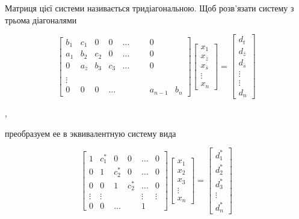 \documentclass[
  ukrainian,
]{article}
\begin{document}
Матриця цієї системи називається тридіагональною. Щоб розв'язати систему
з трьома діагоналями

\[
\begin{bmatrix} b_1 & c_1 & 0 & 0 & \dots & & & 0 \\ a_1 & b_2 & c_2 & 0 & \dots & & & 0 \\ 0 & a_{\bar{z}} & b_3 & c_3 & \dots & & & 0 \\ & & & & & & & & \\ \vdots & & & & & & & & \\ 0 & 0 & 0 & \dots & & & & a_{n-1} & b_n \end{bmatrix}
\begin{bmatrix} x_1 \\ x_{\bar{z}} \\ x_{\bar{s}} \\ \vdots \\ x_n \end{bmatrix}
=
\begin{bmatrix} d_t \\ d_{\bar{z}} \\ d_{\bar{s}} \\ \vdots \\ \vdots \\ d_n \end{bmatrix}
\]

,

преобразуем ее в эквивалентную систему вида

\[
\begin{bmatrix} 1 & c_1^* & 0 & 0 & \dots & 0 \\ 0 & 1 & c_2^* & 0 & \dots & 0 \\ 0 & 0 & 1 & c_2^* & \dots & 0 \\ \vdots & \vdots & & & \vdots & \vdots \\ 0 & 0 & \dots & & 1 \end{bmatrix}
\begin{bmatrix} x_1 \\ x_2 \\ x_3 \\ \vdots \\ x_n \end{bmatrix}
=
\begin{bmatrix} d_1^* \\ d_2^* \\ d_3^* \\ \vdots \\ d_n^* \end{bmatrix}
\]
\end{document}
